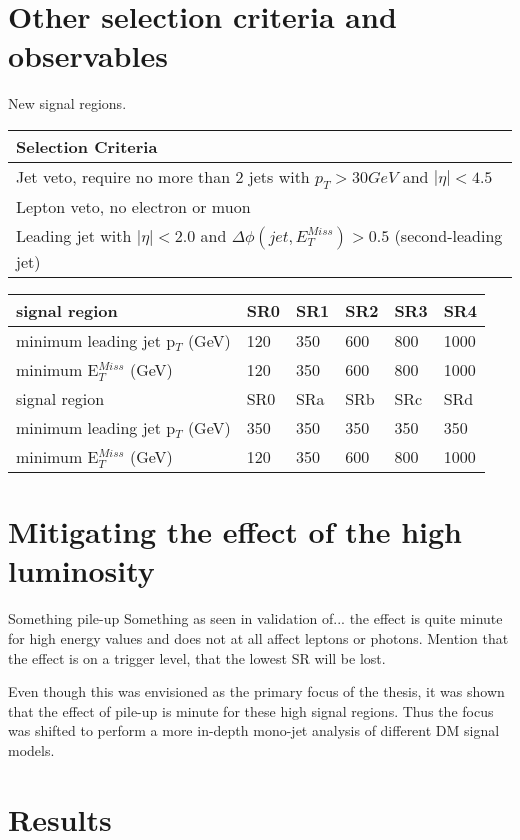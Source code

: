 \section{Other selection criteria and observables}
New signal regions.
\begin{table}[h]
\begin{center}
\begin{tabular}{l}
\hline
Selection Criteria \\ \hline
Jet veto, require no more than 2 jets with $p_T > 30 GeV$ and $|\eta| < 4.5$ \\
Lepton veto, no electron or muon \\
Leading jet with $|\eta| < 2.0$ and $\Delta \phi (jet, E_T^{Miss})>0.5$ (second-leading jet) \\ \hline
\end{tabular}
\begin{tabular}{l l l l l l}
signal region & SR0 & SR1 & SR2 & SR3 & SR4 \\ \hline
minimum leading jet p$_T$ (GeV) & 120 & 350 & 600 & 800 & 1000 \\
minimum E$^{Miss}_T$ (GeV) & 120 & 350 & 600 & 800 & 1000 \\ \hline
signal region & SR0 & SRa & SRb & SRc & SRd \\ \hline
minimum leading jet p$_T$ (GeV) & 350 & 350 & 350 & 350 & 350 \\
minimum E$^{Miss}_T$ (GeV) & 120 & 350 & 600 & 800 & 1000 \\ \hline
\end{tabular}
\end{center}
\end{table}

\section{Mitigating the effect of the high luminosity}
Something pile-up
Something as seen in validation of... the effect is quite minute for high energy values and does not at all affect leptons or photons. Mention that the effect is on a trigger level, that the lowest SR will be lost.

Even though this was envisioned as the primary focus of the thesis, it was shown that the effect of pile-up is minute for these high signal regions. Thus the focus was shifted to perform a more in-depth mono-jet analysis of different DM signal models.
\section{Results}

